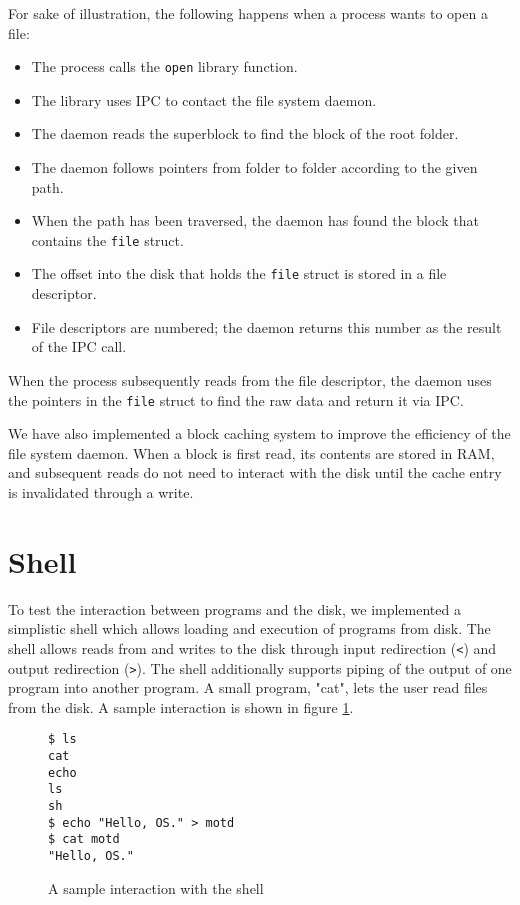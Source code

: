 \documentclass{report}
\begin{document}
For sake of illustration, the following happens when a process wants to open a
file:
\begin{itemize}
\item The process calls the \texttt{open} library function.
\item The library uses IPC to contact the file system daemon.
\item The daemon reads the superblock to find the block of the root folder.
\item The daemon follows pointers from folder to folder according to the given
path.
\item When the path has been traversed, the daemon has found the block that
contains the \texttt{file} struct.
\item The offset into the disk that holds the \texttt{file} struct is stored
in a file descriptor.
\item File descriptors are numbered; the daemon returns this number as the
result of the IPC call.
\end{itemize}
When the process subsequently reads from the file descriptor, the daemon
uses the pointers in the \texttt{file} struct to find the raw data and return
it via IPC.

We have also implemented a block caching system to improve the efficiency of
the file system daemon. When a block is first read, its contents are stored in
RAM, and subsequent reads do not need to interact with the disk until the
cache entry is invalidated through a write.


\section{Shell}
\label{sec:shell}
To test the interaction between programs and the disk, we implemented a
simplistic shell which allows loading and execution of programs from disk. The
shell allows reads from and writes to the disk through input redirection
(\texttt{<}) and output redirection (\texttt{>}). The shell additionally
supports piping of the output of one program into another program. A small
program, "cat", lets the user read files from the disk. A sample interaction
is shown in figure \ref{fig:shellinteraction}.

\begin{figure}[h]
\begin{framed}
\begin{Verbatim}[fontsize=\small]
$ ls
cat
echo
ls
sh
$ echo "Hello, OS." > motd
$ cat motd
"Hello, OS." 
\end{Verbatim}
\end{framed}
\caption{A sample interaction with the shell}
\label{fig:shellinteraction}
\end{figure}
\end{document}
